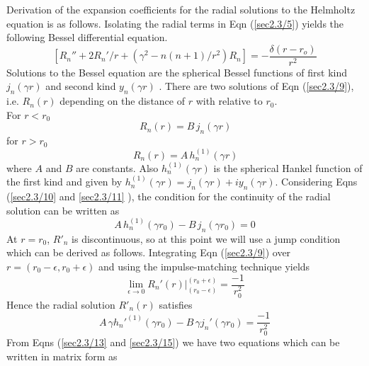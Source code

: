 Derivation of the expansion coefficients for the radial solutions to the Helmholtz equation is  as follows. Isolating the radial terms in Eqn (\ref{sec2.3/5}) yields the following  Bessel differential equation. 
\begin{equation}
\label{sec2.3/9}
\left [ R_n'' + 2 R_n'/r + (\gamma^2 - n(n+1)/r^2 )R_n \right ] 
= - \frac{\delta (r-r_o)}{r^2}
\end{equation}
Solutions to the Bessel equation are the spherical Bessel functions of first kind $j_n(\gamma r)$ and second kind $y_n(\gamma r)$ \cite{weisstein2006bessel}.
 There are two  solutions of Eqn  (\ref{sec2.3/9}), i.e. $R_n(r)$ depending on the distance  of $r$ with relative to $r_0$.  
\\ \enskip    For \enskip  $r < r_0$
\begin{equation}
\label{sec2.3/10}
\,{R_{n}(r)} = B\,j_n{(\gamma r) }
\end{equation}
 for \enskip $ r > r_0$
\begin{equation}
\label{sec2.3/11}
  \,{R_{n}(r)}   = A\,h_n^{(1)}{(\gamma r)} 
\end{equation}
where $A$ and  $B$ are constants. Also  $h_n^{(1)}(\gamma r)$ is the spherical Hankel function of the first kind \cite{weisstein2006bessel,wiki:hankel} and given by $ h_{n}^{(1)}(\gamma r) = j_{n}(\gamma r) + i y_n(\gamma r)$.
 Considering Eqns (\ref{sec2.3/10} and \ref{sec2.3/11} ), the condition for the continuity of the radial solution can be written as 
\begin{equation}
\label{sec2.3/13}
A\,h_n^{(1)}{(\gamma r_{0})}-B\,j_n{(\gamma r_{0})}=0 
\end{equation}
 At $r = r_0$, $R'_n$ is discontinuous, so at this point we will use a jump condition which can be derived as follows.
Integrating Eqn (\ref{sec2.3/9}) over  $r = (r_0-\epsilon,r_0 +\epsilon)$
and using the impulse-matching technique yields
\begin{equation}
\lim_{\epsilon \to 0} {R_{n}'(r)}{\bigg|_{(r_{0}-\epsilon)}^{(r_{0}+\epsilon)}} = \frac{-1}{r_{0}^2}  
\end{equation}
Hence the radial solution $R'_n(r)$ satisfies
\begin{equation}
\label{sec2.3/15}
A\,\gamma h_{n}'^{(1)}(\gamma r_0)-B\,\gamma j_{n}'(\gamma r_0) =  \frac{-1}{r_{0}^2}  
\end{equation}
From Eqns (\ref{sec2.3/13} and \ref{sec2.3/15}) we have two equations which  can be written in matrix form as 

